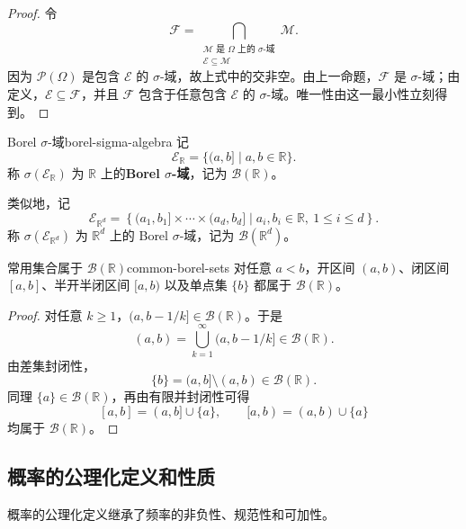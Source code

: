 \begin{proof}
令
\[
\mathscr{F}
=\bigcap_{\substack{\mathscr{M}\text{ 是 }\Omega\text{ 上的 }\sigma\text{-域}\\ \mathscr{E}\subseteq\mathscr{M}}}\mathscr{M}.
\]
因为 $\mathcal{P}(\Omega)$ 是包含 $\mathscr{E}$ 的 $\sigma$-域，故上式中的交非空。由上一命题，$\mathscr{F}$ 是 $\sigma$-域；由定义，$\mathscr{E}\subseteq\mathscr{F}$，并且 $\mathscr{F}$ 包含于任意包含 $\mathscr{E}$ 的 $\sigma$-域。唯一性由这一最小性立刻得到。
\end{proof}

\begin{mydefinition}{Borel $\sigma$-域}{borel-sigma-algebra}
记
\[
\mathscr{E}_{\mathbb{R}}=\{(a,b]\mid a,b\in\mathbb{R}\}.
\]
称 $\sigma(\mathscr{E}_{\mathbb{R}})$ 为 $\mathbb{R}$ 上的\textbf{Borel $\sigma$-域}，记为 $\mathscr{B}(\mathbb{R})$。

类似地，记
\[
\mathscr{E}_{\mathbb{R}^d}
=\left\{(a_1,b_1]\times\cdots\times(a_d,b_d]\mid a_i,b_i\in\mathbb{R},\ 1\leq i\leq d\right\}.
\]
称 $\sigma(\mathscr{E}_{\mathbb{R}^d})$ 为 $\mathbb{R}^d$ 上的 Borel $\sigma$-域，记为 $\mathscr{B}(\mathbb{R}^d)$。
\end{mydefinition}

\begin{proposition}{常用集合属于 $\mathscr{B}(\mathbb{R})$}{common-borel-sets}
对任意 $a<b$，开区间 $(a,b)$、闭区间 $[a,b]$、半开半闭区间 $[a,b)$ 以及单点集 $\{b\}$ 都属于 $\mathscr{B}(\mathbb{R})$。
\end{proposition}

\begin{proof}
对任意 $k\geq1$，$(a,b-1/k]\in\mathscr{B}(\mathbb{R})$。于是
\[
(a,b)=\bigcup_{k=1}^{\infty}(a,b-1/k]\in\mathscr{B}(\mathbb{R}).
\]
由差集封闭性，
\[
\{b\}=(a,b]\setminus(a,b)\in\mathscr{B}(\mathbb{R}).
\]
同理 $\{a\}\in\mathscr{B}(\mathbb{R})$，再由有限并封闭性可得
\[
[a,b]=(a,b]\cup\{a\},
\qquad
[a,b)=(a,b)\cup\{a\}
\]
均属于 $\mathscr{B}(\mathbb{R})$。
\end{proof}

\subsection*{概率的公理化定义和性质}

概率的公理化定义继承了频率的非负性、规范性和可加性。

